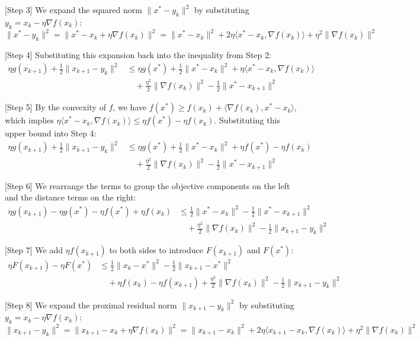 \documentclass{article}
\begin{document}
[Step 3] We expand the squared norm $\|x^* - y_k\|^2$ by substituting $y_k = x_k - \eta \nabla f(x_k)$:
\begin{equation}
\|x^* - y_k\|^2 = \|x^* - x_k + \eta \nabla f(x_k)\|^2 = \|x^* - x_k\|^2 + 2\eta \langle x^* - x_k, \nabla f(x_k) \rangle + \eta^2 \|\nabla f(x_k)\|^2
\end{equation}

[Step 4] Substituting this expansion back into the inequality from Step 2:
\begin{align}
\eta g(x_{k+1}) + \frac{1}{2}\|x_{k+1} - y_k\|^2 &\leq \eta g(x^*) + \frac{1}{2}\|x^* - x_k\|^2 + \eta \langle x^* - x_k, \nabla f(x_k) \rangle \\
&\quad + \frac{\eta^2}{2} \|\nabla f(x_k)\|^2 - \frac{1}{2}\|x^* - x_{k+1}\|^2
\end{align}

[Step 5] By the convexity of $f$, we have $f(x^*) \geq f(x_k) + \langle \nabla f(x_k), x^* - x_k \rangle$, which implies $\eta \langle x^* - x_k, \nabla f(x_k) \rangle \leq \eta f(x^*) - \eta f(x_k)$. Substituting this upper bound into Step 4:
\begin{align}
\eta g(x_{k+1}) + \frac{1}{2}\|x_{k+1} - y_k\|^2 &\leq \eta g(x^*) + \frac{1}{2}\|x^* - x_k\|^2 + \eta f(x^*) - \eta f(x_k) \\
&\quad + \frac{\eta^2}{2} \|\nabla f(x_k)\|^2 - \frac{1}{2}\|x^* - x_{k+1}\|^2
\end{align}

[Step 6] We rearrange the terms to group the objective components on the left and the distance terms on the right:
\begin{align}
\eta g(x_{k+1}) - \eta g(x^*) - \eta f(x^*) + \eta f(x_k) &\leq \frac{1}{2}\|x^* - x_k\|^2 - \frac{1}{2}\|x^* - x_{k+1}\|^2 \\
&\quad + \frac{\eta^2}{2} \|\nabla f(x_k)\|^2 - \frac{1}{2}\|x_{k+1} - y_k\|^2
\end{align}

[Step 7] We add $\eta f(x_{k+1})$ to both sides to introduce $F(x_{k+1})$ and $F(x^*)$:
\begin{align}
\eta F(x_{k+1}) - \eta F(x^*) &\leq \frac{1}{2}\|x_k - x^*\|^2 - \frac{1}{2}\|x_{k+1} - x^*\|^2 \\
&\quad + \eta f(x_k) - \eta f(x_{k+1}) + \frac{\eta^2}{2} \|\nabla f(x_k)\|^2 - \frac{1}{2}\|x_{k+1} - y_k\|^2
\end{align}

[Step 8] We expand the proximal residual norm $\|x_{k+1} - y_k\|^2$ by substituting $y_k = x_k - \eta \nabla f(x_k)$:
\begin{equation}
\|x_{k+1} - y_k\|^2 = \|x_{k+1} - x_k + \eta \nabla f(x_k)\|^2 = \|x_{k+1} - x_k\|^2 + 2\eta \langle x_{k+1} - x_k, \nabla f(x_k) \rangle + \eta^2 \|\nabla f(x_k)\|^2
\end{equation}
\end{document}
